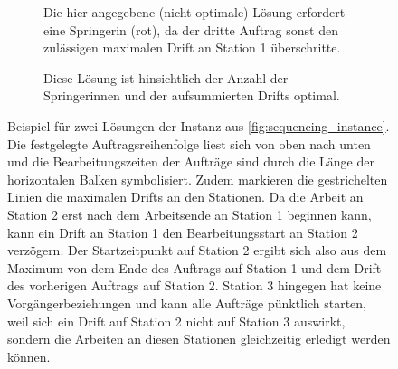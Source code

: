 \begin{figure}[H]
    \centering
    \begin{subfigure}[t]{0.48\textwidth}
        \caption{%
        \label{fig:example_jumper}
        Die hier angegebene (nicht optimale) Lösung erfordert eine Springerin (rot),
        da der dritte Auftrag sonst den zulässigen maximalen Drift an Station 1 überschritte.
        }
    \end{subfigure}%
    \hfill
    \begin{subfigure}[t]{0.48\textwidth}
        \caption{%
        \label{fig:example_optimal}
        Diese Lösung ist hinsichtlich der Anzahl der Springerinnen und der aufsummierten Drifts optimal.
        }
    \end{subfigure}
    \caption{%
    \label{fig:example_sequencing}
    Beispiel für zwei Lösungen der Instanz aus \cref{fig:sequencing_instance}.
    Die festgelegte Auftragsreihenfolge liest sich von oben nach unten
    und die Bearbeitungszeiten der Aufträge sind durch die Länge der horizontalen Balken symbolisiert.
    Zudem markieren die gestrichelten Linien die maximalen Drifts an den Stationen.
    Da die Arbeit an Station 2 erst nach dem Arbeitsende an Station 1 beginnen kann,
    kann ein Drift an Station 1 den Bearbeitungsstart an Station 2 verzögern.
    Der Startzeitpunkt auf Station 2 ergibt sich also aus dem Maximum von dem Ende des Auftrags auf Station 1
    und dem Drift des vorherigen Auftrags auf Station 2.
    Station 3 hingegen hat keine Vorgängerbeziehungen und kann alle Aufträge pünktlich starten,
    weil sich ein Drift auf Station 2 nicht auf Station 3 auswirkt,
    sondern die Arbeiten an diesen Stationen gleichzeitig erledigt werden können.}
\end{figure}

